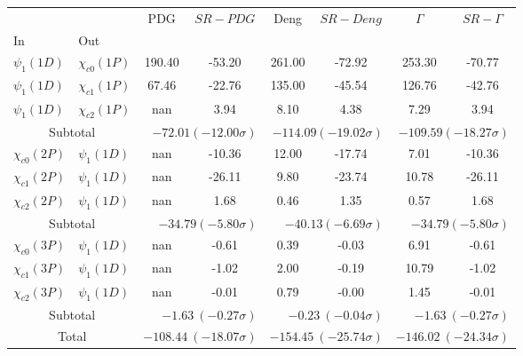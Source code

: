 \begin{tabular}{|l|l|c|c|c|c|c|c|}%
\hline%
&&PDG&$SR-PDG$&Deng&$SR-Deng$&$\Gamma$&$SR-\Gamma$\\%
In&Out&&&&&&\\%
\hline%
$\psi_{1}(1D)$&$\chi_{c0}(1P)$&190.40&-53.20&261.00&-72.92&253.30&-70.77\\%
$\psi_{1}(1D)$&$\chi_{c1}(1P)$&67.46&-22.76&135.00&-45.54&126.76&-42.76\\%
$\psi_{1}(1D)$&$\chi_{c2}(1P)$&nan&3.94&8.10&4.38&7.29&3.94\\%
\hline%
\hline%
\multicolumn{2}{|c|}{Subtotal}&\multicolumn{2}{|r|}{$-72.01 (-12.00\sigma)$}&\multicolumn{2}{|r|}{$-114.09 (-19.02\sigma)$}&\multicolumn{2}{|r|}{$-109.59 (-18.27\sigma)$}\\%
\hline%
\hline%
$\chi_{c0}(2P)$&$\psi_{1}(1D)$&nan&-10.36&12.00&-17.74&7.01&-10.36\\%
$\chi_{c1}(2P)$&$\psi_{1}(1D)$&nan&-26.11&9.80&-23.74&10.78&-26.11\\%
$\chi_{c2}(2P)$&$\psi_{1}(1D)$&nan&1.68&0.46&1.35&0.57&1.68\\%
\hline%
\hline%
\multicolumn{2}{|c|}{Subtotal}&\multicolumn{2}{|r|}{$-34.79 (-5.80\sigma)$}&\multicolumn{2}{|r|}{$-40.13 (-6.69\sigma)$}&\multicolumn{2}{|r|}{$-34.79 (-5.80\sigma)$}\\%
\hline%
\hline%
$\chi_{c0}(3P)$&$\psi_{1}(1D)$&nan&-0.61&0.39&-0.03&6.91&-0.61\\%
$\chi_{c1}(3P)$&$\psi_{1}(1D)$&nan&-1.02&2.00&-0.19&10.79&-1.02\\%
$\chi_{c2}(3P)$&$\psi_{1}(1D)$&nan&-0.01&0.79&-0.00&1.45&-0.01\\%
\hline%
\hline%
\multicolumn{2}{|c|}{Subtotal}&\multicolumn{2}{|r|}{$-1.63~(-0.27\sigma)$}&\multicolumn{2}{|r|}{$-0.23~(-0.04\sigma)$}&\multicolumn{2}{|r|}{$-1.63~(-0.27\sigma)$}\\%
\hline%
\hline%
\multicolumn{2}{|c|}{Total}&\multicolumn{2}{|r|}{$-108.44~(-18.07\sigma)$}&\multicolumn{2}{|r|}{$-154.45~(-25.74\sigma)$}&\multicolumn{2}{|r|}{$-146.02~(-24.34\sigma)$}\\%
\hline%
\end{tabular}